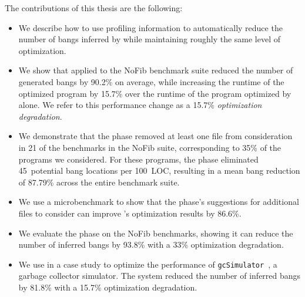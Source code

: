 The contributions of this thesis are the following:
\begin{itemize}
  \item We describe how to use profiling information to automatically reduce the number
    of bangs inferred by \Ao{} while maintaining roughly the same
    level of optimization.
  \item We show that \At{} applied to the NoFib benchmark suite reduced
    the number of generated bangs by 90.2\% on average, while
    increasing the runtime of the optimized program by 15.7\% over the
    runtime of the program optimized by \Ao{} alone. We refer to this
    performance change as a 15.7\% \textit{optimization degradation}.
  \item We demonstrate that the \preopt{} phase removed at least
    one file from consideration in 21 of the benchmarks in the NoFib
    suite, corresponding to 35\% of the programs we considered.
    For these programs, the \preopt{} phase eliminated
    45~potential bang locations per 100~LOC, resulting in a mean bang
    reduction of 87.79\% across the entire benchmark suite.
  \item We use a microbenchmark to show that the \preopt{} phase's
    suggestions for additional files to consider can improve \Ao{}'s
    optimization results by 86.6\%.
  \item We evaluate the \postopt{} phase on the NoFib benchmarks,
    showing it can reduce the number of inferred bangs by
    93.8\% with a 33\% optimization degradation.
  \item We use \At{} in a case study to optimize the performance of
    \texttt{gcSimulator}~\cite{Ricci13}, a garbage collector
    simulator. The system reduced the number of inferred bangs by
    81.8\% with a 15.7\% optimization degradation.
\end{itemize}
